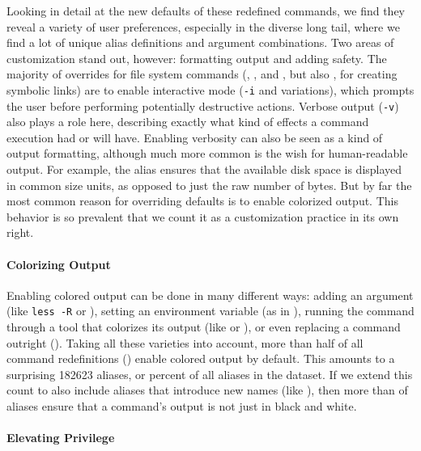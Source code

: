 Looking in detail at the new defaults of these redefined commands, we find they reveal a variety of user preferences, especially in the diverse long tail, where we find a lot of unique alias definitions and argument combinations.
Two areas of customization stand out, however: formatting output and adding safety.
The majority of overrides for file system commands (, , and , but also , for creating symbolic links) are to enable interactive mode (\texttt{-i} and variations), which prompts the user before performing potentially destructive actions.
Verbose output (\texttt{-v}) also plays a role here, describing exactly what kind of effects a command execution had or will have.
Enabling verbosity can also be seen as a kind of output formatting, although much more common is the wish for human-readable output.
For example, the alias  ensures that the available disk space is displayed in common size units, as opposed to just the raw number of bytes.
But by far the most common reason for overriding defaults is to enable colorized output.
This behavior is so prevalent that we count it as a customization practice in its own right.

\paragraph{\bf Colorizing Output}

Enabling colored output can be done in many different ways: adding an argument (like \texttt{less -R} or ), setting an environment variable (as in ), running the command through a tool that colorizes its output (like  or ), or even replacing a command outright ().
Taking all these varieties into account, more than half of all command redefinitions () enable colored output by default.
This amounts to a surprising \num{182623} aliases, or  percent of all aliases in the dataset.
If we extend this count to also include aliases that introduce new names (like ), then more than  of aliases ensure that a command's output is not just in black and white.

\paragraph{\bf Elevating Privilege}

